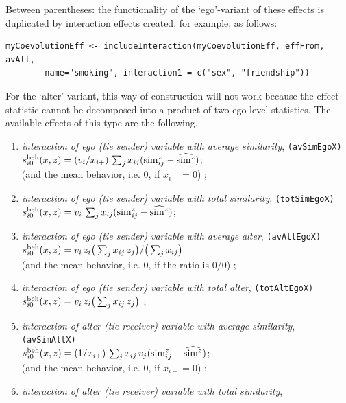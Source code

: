 \documentclass[a4paper,fleqn,11pt]{article}
\newcommand{\+}{\, + \,}
\newcommand{\vit}{\theenumi}
\newcounter{savenumi}
\begin{document}
Between parentheses: the functionality of the `ego'-variant of these effects is duplicated by
interaction effects created, for example, as follows:
\begin{verbatim}
myCoevolutionEff <- includeInteraction(myCoevolutionEff, effFrom, avAlt,
        name="smoking", interaction1 = c("sex", "friendship"))
\end{verbatim}
For the `alter'-variant, this way of construction will not work because the
effect statistic cannot be decomposed into a product of two ego-level statistics.
The available effects of this type are the following.
\begin{enumerate}
\setcounter{enumi}{\value{savenumi}}
\item {\em interaction of ego (tie sender) variable with average similarity},
                       \texttt{(avSimEgoX)} \\
 $s^{\rm beh}_{i\vit}(x, z) = (v_i / x_{i+}) \,
         \sum_j x_{ij} ({\rm sim}^z_{ij} - \widehat{{\rm sim}^z}) $;\\
 (and the mean behavior, i.e. $0$, if $x_{i+} = 0$) ;
\item {\em interaction of ego (tie sender) variable with total similarity},
                       \texttt{(totSimEgoX)} \\
 $s^{\rm beh}_{i\vit}(x, z) = v_i \,
         \sum_j x_{ij} ({\rm sim}^z_{ij} - \widehat{{\rm sim}^z}) $;
\item {\em interaction of ego (tie sender) variable with average alter},
                       \texttt{(avAltEgoX)} \\
 $s^{\rm beh}_{i\vit}(x, z) =  v_i \, z_i \big( \sum_j x_{ij}\, z_j \big)
                                / \big (\sum_j x_{ij}\big)  $\\
 (and the mean behavior, i.e. $0$, if the ratio is 0/0) ;
\item {\em interaction of ego (tie sender) variable with total alter},
                       \texttt{(totAltEgoX)} \\
 $s^{\rm beh}_{i\vit}(x, z) =  v_i \, z_i \big( \sum_j x_{ij}\, z_j \big)   $ ;
\item {\em interaction of alter (tie receiver) variable with average similarity},
                       \texttt{(avSimAltX)} \\
 $s^{\rm beh}_{i\vit}(x, z) = (1 / x_{i+}) \,
         \sum_j x_{ij} \, v_j ({\rm sim}^z_{ij} - \widehat{{\rm sim}^z}) $;\\
 (and the mean behavior, i.e. $0$, if $x_{i+} = 0$) ;
\item {\em interaction of alter (tie receiver) variable with total similarity},

\end{enumerate}
\end{document}
